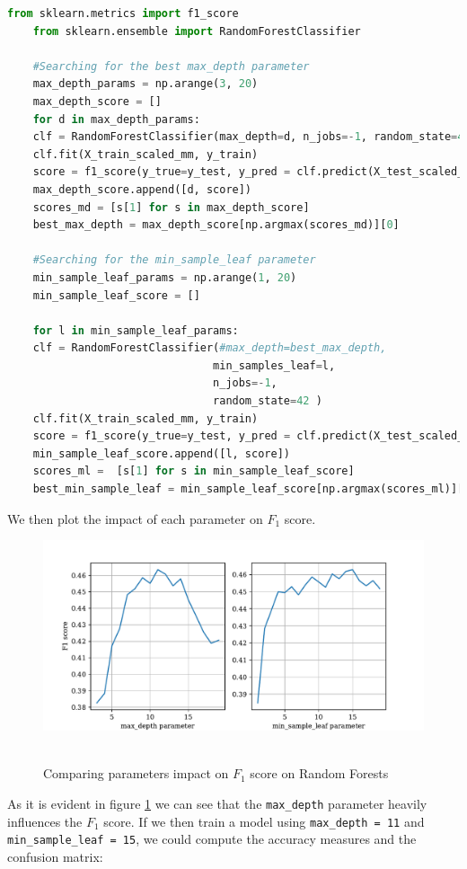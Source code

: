\begin{lstlisting}[language=Python, caption= Searching for the best parameters for a random forest classifier]
    from sklearn.metrics import f1_score
    from sklearn.ensemble import RandomForestClassifier

    #Searching for the best max_depth parameter
    max_depth_params = np.arange(3, 20)
    max_depth_score = []
    for d in max_depth_params:
    clf = RandomForestClassifier(max_depth=d, n_jobs=-1, random_state=42)
    clf.fit(X_train_scaled_mm, y_train)
    score = f1_score(y_true=y_test, y_pred = clf.predict(X_test_scaled_mm))
    max_depth_score.append([d, score])
    scores_md = [s[1] for s in max_depth_score]
    best_max_depth = max_depth_score[np.argmax(scores_md)][0]

    #Searching for the min_sample_leaf parameter
    min_sample_leaf_params = np.arange(1, 20)
    min_sample_leaf_score = []

    for l in min_sample_leaf_params:
    clf = RandomForestClassifier(#max_depth=best_max_depth,
                                min_samples_leaf=l,
                                n_jobs=-1,
                                random_state=42 )
    clf.fit(X_train_scaled_mm, y_train)
    score = f1_score(y_true=y_test, y_pred = clf.predict(X_test_scaled_mm))
    min_sample_leaf_score.append([l, score])
    scores_ml =  [s[1] for s in min_sample_leaf_score]
    best_min_sample_leaf = min_sample_leaf_score[np.argmax(scores_ml)][0]
\end{lstlisting}
We then plot the impact of each parameter on \(F_1\) score.
\begin{figure}[htb]
    \centering
    \includegraphics[scale=0.7]{pictures/random_forest_score.pdf}\
    \caption{Comparing parameters impact on \(F_1\) score on Random Forests}
    \label{fig_random_forest_score}
\end{figure}
As it is evident in figure \ref{fig_random_forest_score} we can see that the \texttt{max\_depth} parameter heavily influences the \(F_1\) score. If we then train a model using \texttt{max\_depth = 11} and \texttt{min\_sample\_leaf = 15}, we could compute the accuracy measures and the confusion matrix:

